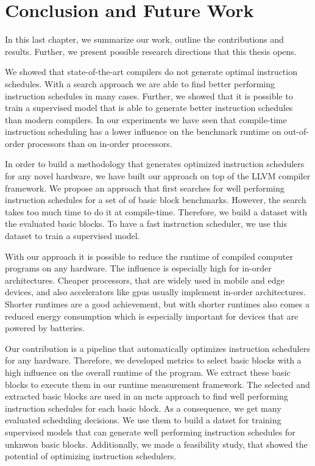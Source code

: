 \chapter{Conclusion and Future Work}
\label{sec:conclusion}
In this last chapter, we summarize our work, outline the contributions and results.
Further, we present possible research directions that this thesis opens.

We showed that state-of-the-art compilers do not generate optimal instruction schedules.
With a search approach we are able to find better performing instruction schedules in many cases.
Further, we showed that it is possible to train a supervised model that is able to generate better instruction schedules than modern compilers.
In our experiments we have seen that compile-time instruction scheduling has a lower influence on the benchmark runtime on out-of-order processors than on in-order processors.

In order to build a methodology that generates optimized instruction schedulers for any novel hardware, we have built our approach on top of the LLVM compiler framework.
We propose an approach that first searches for well performing instruction schedules for a set of of basic block benchmarks.
However, the search takes too much time to do it at compile-time.
Therefore, we build a dataset with the evaluated basic blocks.
To have a fast instruction scheduler, we use this dataset to train a supervised model.

With our approach it is possible to reduce the runtime of compiled computer programs on any hardware.
The influence is especially high for in-order architectures.
Cheaper processors, that are widely used in mobile and edge devices, and also accelerators like \acp{gpu} usually implement in-order architectures.
Shorter runtimes are a good achievement, but with shorter runtimes also comes a reduced energy consumption which is especially important for devices that are powered by batteries.

Our contribution is a pipeline that automatically optimizes instruction schedulers for any hardware.
Therefore, we developed metrics to select basic blocks with a high influence on the overall runtime of the program.
We extract these basic blocks to execute them in our runtime measurement framework.
The selected and extracted basic blocks are used in an \ac{mcts} approach to find well performing instruction schedules for each basic block.
As a consequence, we get many evaluated scheduling decisions.
We use them to build a datset for training supervised models that can generate well performing instruction schedules for unknwon basic blocks.
Additionally, we made a feasibility study, that showed the potential of optimizing instruction schedulers.

